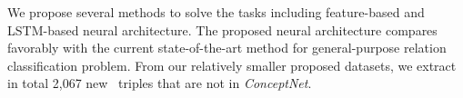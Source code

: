 %
%
%


We propose several methods to solve the tasks including feature-based and LSTM-based neural architecture. 
The proposed neural architecture compares favorably with the current state-of-the-art method for general-purpose relation classification problem.
From our relatively smaller proposed datasets, we extract in total 2,067 new \lnear~triples that are not in \textit{ConceptNet}.


